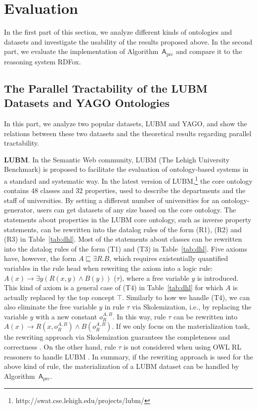 \section{Evaluation}
\label{sec:evaluation}

In the first part of this section, we analyze different kinds of ontologies and datasets
and investigate the usability of the results proposed above.
In the second part, we evaluate the implementation of Algorithm~$\mathsf{A}_{\text{prc}}$
and compare it to the reasoning system RDFox.

\subsection{The Parallel Tractability of the LUBM Datasets and YAGO Ontologies}

In this part, we analyze two popular datasets, LUBM and YAGO, and show the relations
between these two datasets and the theoretical results regarding parallel tractability.

\textbf{LUBM}. In the Semantic Web community, LUBM
(The Lehigh University Benchmark) is proposed to
facilitate the evaluation of ontology-based systems
in a standard and systematic way.
In the latest version of LUBM,\footnote{http://swat.cse.lehigh.edu/projects/lubm/}
the core ontology contains 48 classes and 32 properties, used to describe the departments and the staff of
universities. By setting a different number of universities for an ontology-generator, users can get datasets of any size based on the core ontology.
%
The statements about properties in the LUBM core ontology, such as inverse property statements,
can be rewritten into the datalog rules of the form (R1), (R2) and (R3) in Table~\ref{tab:dhl}.
Most of the statements about classes can be rewritten into the datalog rules of the form (T1) and (T3)
in Table~\ref{tab:dhl}. Five axioms have, however, the form $A\sqsubseteq\exists R.B$,
which requires existentially quantified variables in the rule head when rewriting
the axiom into a logic rule: $A(x)\rightarrow\exists y(R(x,y)\wedge B(y))$ ($\tau$),
where a free variable $y$ is introduced. This kind of axiom is a general case of (T4) in Table~\ref{tab:dhl}
for which $A$ is actually replaced by the top concept $\top$.
Similarly to how we handle (T4), we can also eliminate the free variable $y$
in rule $\tau$ via Skolemization, i.e., by replacing the variable $y$ with a new constant $o_R^{A,B}$.
In this way, rule $\tau$ can be rewritten into $A(x)\rightarrow R(x,o_R^{A,B})\wedge B(o_R^{A,B})$.
If we only focus on the materialization task, the rewriting approach via Skolemization guarantees the
completeness and correctness \cite{GrauHKKMMW13}.
On the other hand, rule $\tau$ is not considered when using OWL RL reasoners to handle LUBM \cite{UrbaniKMHB12,WeaverH09}.
In summary, if the rewriting approach is used for the above kind of rule,
the materialization of a LUBM dataset can be handled by
Algorithm~$\mathsf{A}_{\text{prc}}$.



